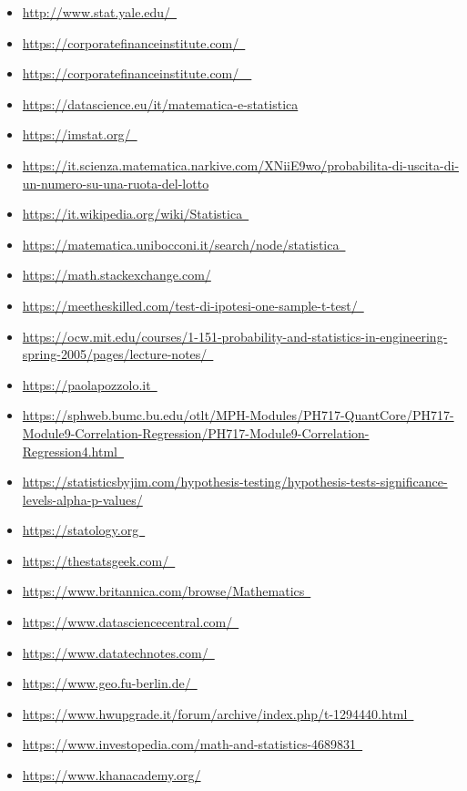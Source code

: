 \documentclass{article}
\begin{document}
\begin{sloppypar}
\begin{itemize}
    \item \url{http://www.stat.yale.edu/ }
    \item \url{https://corporatefinanceinstitute.com/ }
    \item \url{https://corporatefinanceinstitute.com/  }
    \item \url{https://datascience.eu/it/matematica-e-statistica }
    \item \url{https://imstat.org/ }
    \item \url{https://it.scienza.matematica.narkive.com/XNiiE9wo/probabilita-di-uscita-di-un-numero-su-una-ruota-del-lotto}
    \item \url{https://it.wikipedia.org/wiki/Statistica }
    \item \url{https://matematica.unibocconi.it/search/node/statistica }
    \item \url{https://math.stackexchange.com/}
    \item \url{https://meetheskilled.com/test-di-ipotesi-one-sample-t-test/ }
    \item \url{https://ocw.mit.edu/courses/1-151-probability-and-statistics-in-engineering-spring-2005/pages/lecture-notes/ }
    \item \url{https://paolapozzolo.it }
    \item \url{https://sphweb.bumc.bu.edu/otlt/MPH-Modules/PH717-QuantCore/PH717-Module9-Correlation-Regression/PH717-Module9-Correlation-Regression4.html }
    \item \url{https://statisticsbyjim.com/hypothesis-testing/hypothesis-tests-significance-levels-alpha-p-values/}
    \item \url{https://statology.org }
    \item \url{https://thestatsgeek.com/ }
    \item \url{https://www.britannica.com/browse/Mathematics }
    \item \url{https://www.datasciencecentral.com/ }
    \item \url{https://www.datatechnotes.com/ }
    \item \url{https://www.geo.fu-berlin.de/ }
    \item \url{https://www.hwupgrade.it/forum/archive/index.php/t-1294440.html }
    \item \url{https://www.investopedia.com/math-and-statistics-4689831 }
    \item \url{https://www.khanacademy.org/}

\end{itemize}
\end{sloppypar}
\end{document}
